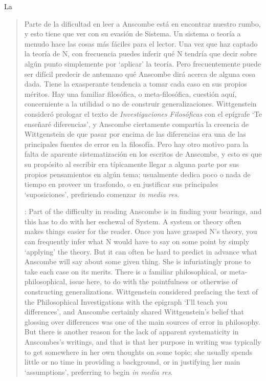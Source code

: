 La

\blockquote[{\cite[1]{teichmann}}: Part of the difficulty in reading Anscombe is
in finding your bearings, and this has to do with her eschewal of System. A
system or theory often makes things easier for the reader. Once you have grasped
N's theory, you can frequently infer what N would have to say on some point by
simply `applying' the theory. But it can often be hard to predict in advance
what Anscombe will say about some given thing. She is infuriatingly prone to
take each case on its merits. There is a familiar philosophical, or
meta-philosophical, issue here, to do with the pointfulness or otherwise of
constructing generalizations. Wittgenstein considered prefacing the text of the
Philosophical Investigations with the epigraph `I'll teach you differences', and
Anscombe certainly shared Wittgenstein's belief that glossing over differences
was one of the main sources of error in philosophy. But there is another reason
for the lack of apparent systematicity in Anscombes's writings, and that is that
her purpose in writing was typically to get somewhere in her own thoughts on
some topic; she usually spends little or no time in providing a background, or
in justifying her main `assumptions', preferring to begin \emph{in media
  res}.]{Parte de la dificultad en leer a Anscombe está en encontrar nuestro
  rumbo, y esto tiene que ver con su evasión de Sistema. Un sistema o teoría a
  menudo hace las cosas más fáciles para el lector. Una vez que haz captado la
  teoría de N, con frecuencia puedes inferir qué N tendría que decir sobre algún
  punto simplemente por \enquote*{aplicar} la teoría. Pero frecuentemente puede
  ser difícil predecir de antemano qué Anscombe dirá acerca de alguna cosa dada.
  Tiene la exasperante tendencia a tomar cada caso en sus propios méritos. Hay
  una familiar filosófica, o meta-filosófica, cuestión aquí, concerniente a la
  utilidad o no de construir generalizaciones. Wittgenstein consideró prologar
  el texto de \emph{Investigaciones Filosóficas} con el epígrafe \enquote*{Te
    enseñaré diferencias}, y Anscombe ciertamente compartía la creencia de
  Wittgenstein de que pasar por encima de las diferencias era una de las
  principales fuentes de error en la filosofía. Pero hay otro motivo para la
  falta de aparente sistematización en los escritos de Anscombe, y esto es que
  su propósito al escribir era típicamente llegar a alguna parte por sus propios
  pensamientos en algún tema; usualmente dedica poco o nada de tiempo en proveer
  un trasfondo, o en justificar sus principales \enquote*{suposiciones},
  prefiriendo comenzar \emph{in media res}.}

